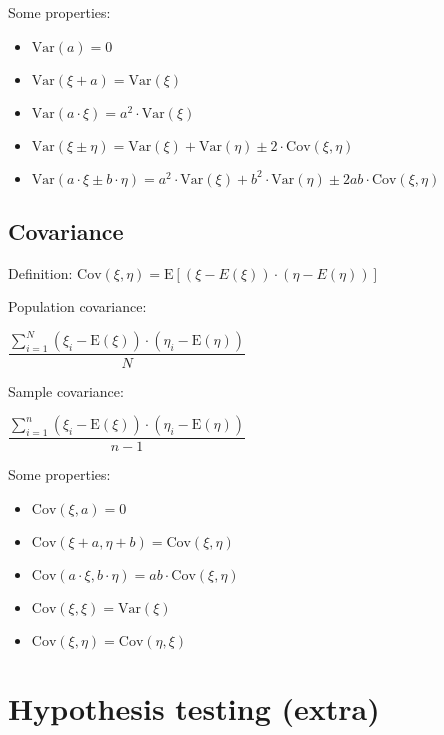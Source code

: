 \documentclass[10pt, a4paper, landscape]{extarticle}
\newcommand{\E}{\mathrm{E}}
\newcommand{\Var}{\mathrm{Var}}
\newcommand{\Cov}{\mathrm{Cov}}
\begin{document}
\begin{multicols}{3}
Some properties:

\begin{itemize}[leftmargin=*]
	\item $\Var(a) = 0$
	\item $\Var(\xi + a) = \Var(\xi)$
	\item $\Var(a \cdot \xi) = a^2 \cdot \Var(\xi)$
	\item $\Var(\xi \pm \eta) = \Var(\xi) + \Var(\eta) \pm 2 \cdot \Cov(\xi, \eta)$
	\item $\Var(a \cdot \xi \pm b \cdot \eta) = a^2 \cdot \Var(\xi) + b^2 \cdot \Var(\eta) \pm 2 a b \cdot \Cov(\xi, \eta)$
\end{itemize}

\subsection*{Covariance}

Definition: \quad $\Cov(\xi, \eta) = \E[(\xi - E(\xi)) \cdot (\eta - E(\eta))]$

\begin{multicols}{2}
	Population covariance:
	\begin{center}
		$\dfrac{\sum_{i=1}^{N} (\xi_i - \E(\xi)) \cdot (\eta_i - \E(\eta))}{N}$
	\end{center}
\columnbreak
	Sample covariance:
	\begin{center}
		$\dfrac{\sum_{i=1}^{n} (\xi_i - \E(\xi)) \cdot (\eta_i - \E(\eta))}{n - 1}$
	\end{center}
\end{multicols}

Some properties:

\begin{itemize}[leftmargin=*]
	\item $\Cov(\xi, a) = 0$
	\item $\Cov(\xi + a, \eta + b) = \Cov(\xi, \eta)$
	\item $\Cov(a \cdot \xi, b \cdot \eta) = a b \cdot \Cov(\xi, \eta)$
	\item $\Cov(\xi, \xi) = \Var(\xi)$
	\item $\Cov(\xi, \eta) = \Cov(\eta, \xi)$
\end{itemize}

\pagebreak

\section*{Hypothesis testing (extra)}


\end{multicols}
\end{document}

